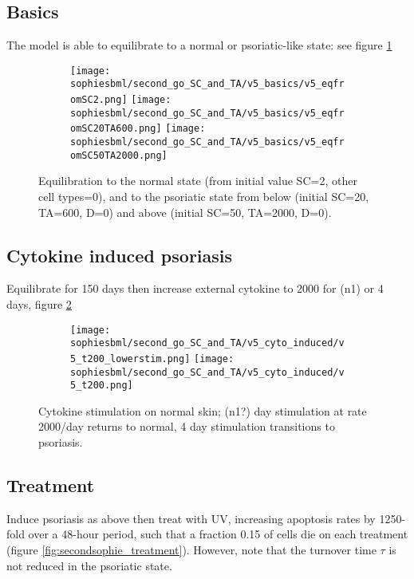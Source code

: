 \documentclass[a4paper,10pt]{report}
\newcommand{\psortbase}{/home/ngrs2/work/bsu/PSORT_Zuliani_Reynolds/}
\newcommand{\sbmlbase}{\psortbase/sbml-sh/}
\newcommand{\sophiesbml}{\sbmlbase/sophie_like}
\begin{document}
\subsection{Basics}

The model is able to equilibrate to a normal or psoriatic-like state: see figure \ref{fig:secondsophie_basics}

\begin{figure}[h!]
  \begin{subfigure}{\textwidth}
    \texttt{[image: \\sophiesbml/second\_go\_SC\_and\_TA/v5\_basics/v5\_eqfromSC2.png]}
    \texttt{[image: \\sophiesbml/second\_go\_SC\_and\_TA/v5\_basics/v5\_eqfromSC20TA600.png]}
    \texttt{[image: \\sophiesbml/second\_go\_SC\_and\_TA/v5\_basics/v5\_eqfromSC50TA2000.png]}
  \end{subfigure}
  \caption{Equilibration to the normal state (from initial value SC=2, other cell types=0), and to the psoriatic state from below (initial SC=20, TA=600, D=0) and above (initial SC=50, TA=2000, D=0).}
  \label{fig:secondsophie_basics}
\end{figure}


\subsection{Cytokine induced psoriasis}

Equilibrate for 150 days then increase external cytokine to 2000 for (n1) or 4 days, figure \ref{fig:secondsophie_cytostim}


\begin{figure}[h!]
  \begin{subfigure}{\textwidth}
    \texttt{[image: \\sophiesbml/second\_go\_SC\_and\_TA/v5\_cyto\_induced/v5\_t200\_lowerstim.png]}
    \texttt{[image: \\sophiesbml/second\_go\_SC\_and\_TA/v5\_cyto\_induced/v5\_t200.png]}
  \end{subfigure}
  \caption{Cytokine stimulation on normal skin; (n1?) day stimulation at rate 2000/day returns to normal, 4 day stimulation transitions to psoriasis.}
  \label{fig:secondsophie_cytostim}
\end{figure}

\subsection{Treatment}

Induce psoriasis as above then treat with UV, increasing apoptosis rates by 1250-fold over a 48-hour period, such that a fraction 0.15 of cells die on each treatment (figure \ref{fig:secondsophie_treatment}). However, note that the turnover time $\tau$ is not reduced in the psoriatic state.
\end{document}
